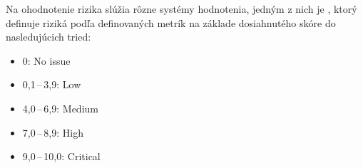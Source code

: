 \vspace{2em}
\noindent
Na ohodnotenie rizika slúžia rôzne systémy hodnotenia, jedným z nich je  , ktorý definuje riziká podľa definovaných metrík na základe dosiahnutého skóre do nasledujúcich tried:

\begin{itemize}
	\item 0: No issue
	\item 0,1\,--\,3,9: Low
	\item 4,0\,--\,6,9: Medium
	\item 7,0\,--\,8,9: High
	\item 9,0\,--\,10,0: Critical
\end{itemize} 